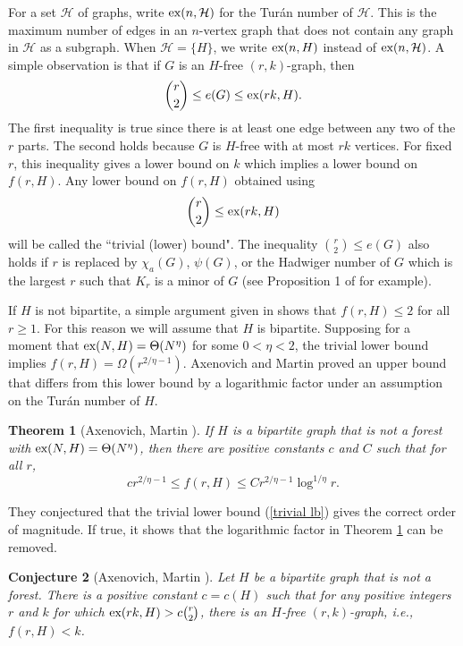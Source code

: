 \documentclass[12pt]{article}%
\newtheorem{theorem}{Theorem}[section]
\newtheorem{conjecture}[theorem]{Conjecture}
\begin{document}
For a set $\mathcal{H}$ of graphs, write 
$\textup{ex} ( n , \mathcal{H})$ for the Tur\'{a}n number of $\mathcal{H}$.  This is the maximum number of edges in an $n$-vertex graph that does not contain any graph in $\mathcal{H}$ as a subgraph.  When $\mathcal{H} = \{H \}$, we write $\textup{ex} ( n , H)$ instead of 
$\textup{ex}(n , \mathcal{H} )$.   
A simple observation is that if $G$ is an $H$-free $(r,k)$-graph, then 
\[
\binom{r}{2} \leq e(G) \leq \textup{ex}( rk , H).
\]
The first inequality is true since there is at least 
one edge between any two of the $r$ parts.  The second holds because $G$ is $H$-free with at most $rk$ vertices.  For fixed $r$, this inequality gives a lower bound on $k$ which implies a lower bound on $f(r,H)$.  Any lower bound on $f(r,H)$ obtained using  
\begin{equation}\label{trivial lb}
\binom{r}{2} \leq \textup{ex}( rk, H) 
\end{equation}
will be called the ``trivial (lower) bound".  The inequality $\binom{r}{2} \leq e(G)$ also holds if $r$ is replaced by $\chi_a (G)$, $\psi (G)$, or the Hadwiger number of $G$ which is the largest $r$ such that $K_r$ is a minor of $G$ (see Proposition 1 of \cite{KrivSudakov} for example).      

If $H$ is not bipartite, a simple argument given in \cite{AxeMartin} shows that $f(r,H) \leq 2$ for all $r \geq 1$.  For this reason we will assume that $H$ is bipartite.  
Supposing for a moment that 
$\textup{ex}(N, H) = \Theta( N^{ \eta} )$ for some
$0 < \eta < 2$, the trivial lower bound 
implies $f(r,H) = \Omega ( r^{2 / \eta - 1} )$.  
Axenovich and Martin proved an upper bound that differs from this lower bound by a logarithmic factor under an assumption on the Tur\'{a}n number of $H$.  

\begin{theorem}[Axenovich, Martin \cite{AxeMartin}]\label{AM:theorem}
	If $H$ is a bipartite graph that is not a forest with $\textup{ex}(N, H) = \Theta( N^{\eta} )$, then there are positive constants $c$ and $C$ such that for all $r$,  
	\[
	c r^{2/ \eta - 1} \leq f(r, H) \leq C r^{2/ \eta - 1} \log^{1/ \eta }r.
	\]
	\end{theorem}
They conjectured that the trivial lower bound (\ref{trivial lb}) gives the correct order of magnitude.  If true, it shows that the logarithmic factor in Theorem \ref{AM:theorem} can be removed.  
       
\begin{conjecture}[Axenovich, Martin \cite{AxeMartin}]\label{conj}
	Let $H$ be a bipartite graph that is not a forest.  There is a positive constant $c = c(H)$ such that for any positive integers $r$ and $k$ for which $\textup{ex}( rk, H) > c \binom{r}{2}$, there is an $H$-free $(r,k)$-graph, i.e., $f(r,H) < k$.      
	\end{conjecture}  
\end{document}
